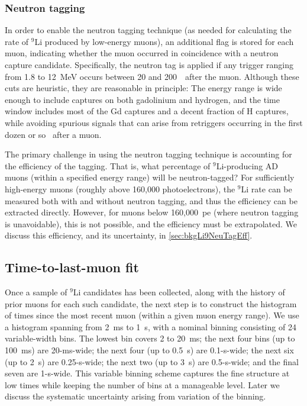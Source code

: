 \documentclass[../thesis.tex]{subfiles}
\begin{document}
\subsubsection{Neutron tagging}
\label{sec:bkgLi9NeuTag}

In order to enable the neutron tagging technique (as needed for calculating the rate of $^9$Li produced by low-energy muons), an additional flag is stored for each muon, indicating whether the muon occurred in coincidence with a neutron capture candidate. Specifically, the neutron tag is applied if any trigger ranging from 1.8 to 12~MeV
occurs between 20 and 200~\us\ after the muon. Although these cuts are heuristic, they are reasonable in principle: The energy range is wide enough to include captures on both gadolinium and hydrogen, and the time window includes most of the Gd captures and a decent fraction of H captures, while avoiding spurious signals that can arise from retriggers occurring in the first dozen or so \us\ after a muon.

The primary challenge in using the neutron tagging technique is accounting for the efficiency of the tagging. That is, what percentage of $^9$Li-producing AD muons (within a specified energy range) will be neutron-tagged? For sufficiently high-energy muons (roughly above 160,000 photoelectrons), the $^9$Li rate can be measured both with and without neutron tagging, and thus the efficiency can be extracted directly. However, for muons below 160,000~pe (where neutron tagging is unavoidable), this is not possible, and the efficiency must be extrapolated. We discuss this efficiency, and its uncertainty, in \autoref{sec:bkgLi9NeuTagEff}.

\subsection{Time-to-last-muon fit}
\label{sec:bkgLi9HistoFit}

Once a sample of $^9$Li candidates has been collected, along with the history of prior muons for each such candidate, the next step is to construct the histogram of times since the most recent muon (within a given muon energy range). We use a histogram spanning from 2~ms to 1~s, with a nominal binning consisting of 24 variable-width bins. The lowest bin covers 2 to 20~ms; the next four bins (up to 100~ms) are 20-ms-wide; the next four (up to 0.5~s) are 0.1-s-wide; the next six (up to 2~s) are 0.25-s-wide; the next two (up to 3~s) are 0.5-s-wide; and the final seven are 1-s-wide. This variable binning scheme captures the fine structure at low times while keeping the number of bins at a manageable level. Later we discuss the systematic uncertainty arising from variation of the binning.
\end{document}
